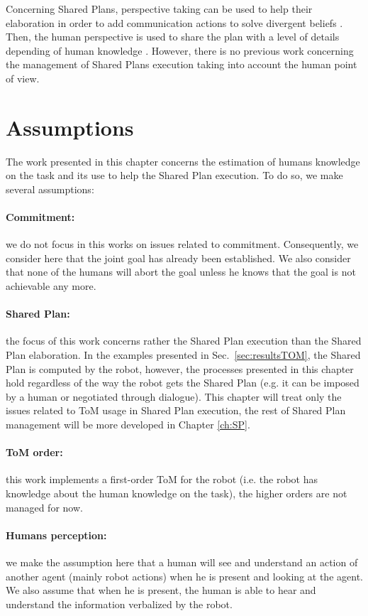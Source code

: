 \documentclass[english,a4paper,11pt,twoside]{StyleThese}
\begin{document}
Concerning Shared Plans, perspective taking can be used to help their elaboration in order to add communication actions to solve divergent beliefs \cite{guitton2012belief}. Then, the human perspective is used to share the plan with a level of details depending of human knowledge \cite{milliez2016using}. However, there is no previous work concerning the management of Shared Plans execution taking into account the human point of view. 

\section{Assumptions}


The work presented in this chapter concerns the estimation of humans knowledge on the task and its use to help the Shared Plan execution. To do so, we make several assumptions:

\paragraph{Commitment:} we do not focus in this works on issues related to commitment. Consequently, we consider here that the joint goal has already been established. We also consider that none of the humans will abort the goal unless he knows that the goal is not achievable any more.

\paragraph{Shared Plan:} the focus of this work concerns rather the Shared Plan execution than the Shared Plan elaboration. In the examples presented in Sec.~\ref{sec:resultsTOM}, the Shared Plan is computed by the robot, however, the processes presented in this chapter hold regardless of the way the robot gets the Shared Plan (e.g. it can be imposed by a human or negotiated through dialogue). This chapter will treat only the issues related to ToM usage in Shared Plan execution, the rest of Shared Plan management will be more developed in Chapter \ref{ch:SP}.

\paragraph{ToM order:} this work implements a first-order ToM for the robot (i.e. the robot has knowledge about the human knowledge on the task), the higher orders are not managed for now.

\paragraph{Humans perception:} we make the assumption here that a human will see and understand an action of another agent (mainly robot actions) when he is present and looking at the agent. We
also assume that when he is present, the human is able to hear and understand the information verbalized by the robot.
\end{document}
